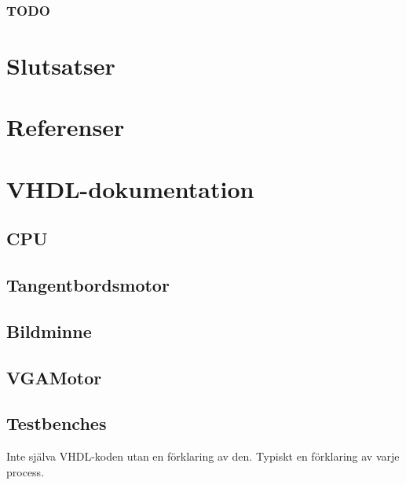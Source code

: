\documentclass[]{article}
\begin{document}
\subsubsection{TODO}

\section{Slutsatser}
\section{Referenser}
\section{VHDL-dokumentation}
\subsection{CPU}

\subsection{Tangentbordsmotor}

\subsection{Bildminne}

\subsection{VGAMotor}

\subsection{Testbenches}
Inte själva VHDL-koden utan en förklaring av den. Typiskt en förklaring av varje process.
\end{document}
